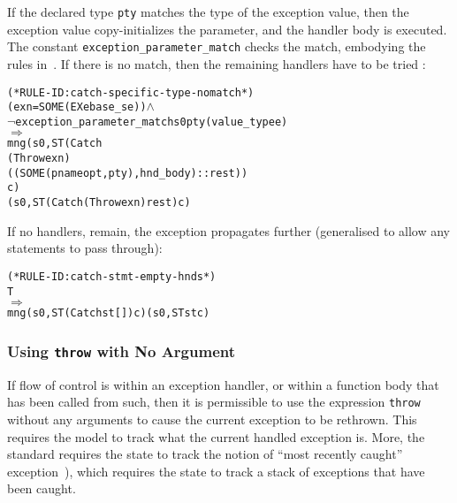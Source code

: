 \documentclass[11pt]{article}
\begin{document}
If the declared type \texttt{pty} matches the type of the exception
value, then the exception value copy-initializes the parameter, and
the handler body is executed.  The constant
\texttt{exception_parameter_match} checks the match, embodying the
rules in~\cite[\S15.3, paragraph 3]{cpp-standard-iso14882}.  If there
is no match, then the remaining handlers have to be tried
:
\begin{center}
  \begin{minipage}{\textwidth}
%
\begin{alltt}
(* RULE-ID: catch-specific-type-nomatch *)
     (exn = SOME (EX e base_se)) \(\land\)
     \(\neg\)exception_parameter_match s0 pty (value_type e)
   \(\Rightarrow\)
     mng (s0, ST (Catch
                    (Throw exn)
                    ((SOME(pnameopt, pty), hnd_body) :: rest))
                 c)
         (s0, ST (Catch (Throw exn) rest) c)
\end{alltt}
  \end{minipage}
\end{center}
If no handlers, remain, the exception propagates further
 (generalised to allow any statements to
pass through):
\begin{center}
  \begin{minipage}{\textwidth}
%
\begin{alltt}
(* RULE-ID: catch-stmt-empty-hnds *)
     T
   \(\Rightarrow\)
     mng (s0, ST (Catch st []) c) (s0, ST st c)
\end{alltt}
  \end{minipage}
\end{center}

\subsubsection{Using \texttt{throw} with No Argument}
\label{sec:throw-none}

If flow of control is within an exception handler, or within a
function body that has been called from such, then it is permissible
to use the expression \texttt{throw} without any arguments to cause
the current exception to be rethrown.  This requires the model to
track what the current handled exception is.  More, the standard
requires the state to track the notion of ``most recently caught''
exception~\cite[\S15.1, paragraph 7]{cpp-standard-iso14882}), which
requires the state to track a stack of exceptions that have been
caught.
\end{document}
